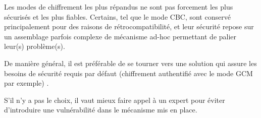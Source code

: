 \documentclass[french,a4paper,11pt]{exam}
\begin{document}
	Les modes de chiffrement les plus répandus ne sont pas forcement les plus sécurisés et les plus fiables. Certains, tel que le mode CBC, sont conservé principalement pour des raisons de rétrocompatibilité, et leur sécurité repose sur un assemblage parfois complexe de mécanisme ad-hoc permettant de palier leur(s) problème(s).

	De manière général, il est préférable de se tourner vers une solution qui assure les besoins de sécurité requis par défaut (chiffrement authentifié avec le mode GCM par exemple) . 

	S'il n'y a pas le choix, il vaut mieux faire appel à un expert pour éviter d'introduire une vulnérabilité dans le mécanisme mis en place.
	
\end{document}
